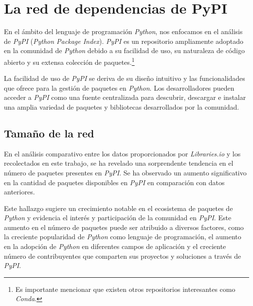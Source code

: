 \newpage

\section{La red de dependencias de PyPI}

En el ámbito del lenguaje de programación \textit{Python}, nos enfocamos en el análisis de \textit{PyPI}
(\textit{Python Package Index}). \textit{PyPI} es un repositorio ampliamente adoptado en la comunidad de
\textit{Python} debido a su facilidad de uso, su naturaleza de código abierto y su extensa colección de
paquetes.\footnote{Es importante mencionar que existen otros repositorios interesantes como \textit{Conda}.}

La facilidad de uso de \textit{PyPI} se deriva de su diseño intuitivo y las funcionalidades que ofrece
para la gestión de paquetes en \textit{Python}. Los desarrolladores pueden acceder a \textit{PyPI} como
una fuente centralizada para descubrir, descargar e instalar una amplia variedad de paquetes y bibliotecas
desarrollados por la comunidad.

\subsection{Tamaño de la red}

En el análisis comparativo entre los datos proporcionados por \textit{Libraries.io} y los recolectados en
este trabajo, se ha revelado una sorprendente tendencia en el número de paquetes presentes en \textit{PyPI}.
Se ha observado un aumento significativo en la cantidad de paquetes disponibles en \textit{PyPI} en
comparación con datos anteriores.

Este hallazgo sugiere un crecimiento notable en el ecosistema de paquetes de \textit{Python} y evidencia
el interés y participación de la comunidad en \textit{PyPI}. Este aumento en el número de paquetes puede
ser atribuido a diversos factores, como la creciente popularidad de \textit{Python} como lenguaje de
programación, el aumento en la adopción de \textit{Python} en diferentes campos de aplicación y el
creciente número de contribuyentes que comparten sus proyectos y soluciones a través de \textit{PyPI}.


